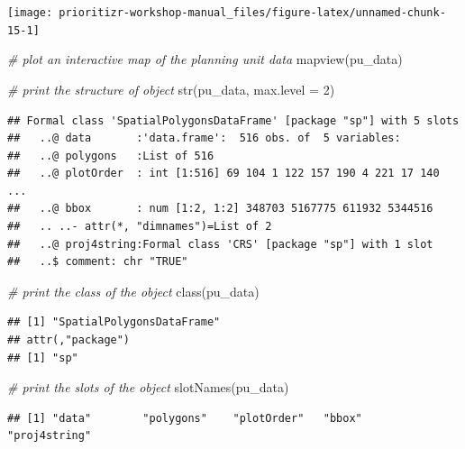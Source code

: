 \documentclass[
  12pt,
]{book}
\newenvironment{Shaded}{\begin{snugshade}}{\end{snugshade}}
\newcommand{\AttributeTok}[1]{\textcolor[rgb]{0.77,0.63,0.00}{#1}}
\newcommand{\CommentTok}[1]{\textcolor[rgb]{0.56,0.35,0.01}{\textit{#1}}}
\newcommand{\DecValTok}[1]{\textcolor[rgb]{0.00,0.00,0.81}{#1}}
\newcommand{\FunctionTok}[1]{\textcolor[rgb]{0.00,0.00,0.00}{#1}}
\newcommand{\NormalTok}[1]{#1}
\begin{document}
\begin{center}\texttt{[image: prioritizr-workshop-manual\_files/figure-latex/unnamed-chunk-15-1]} \end{center}

\begin{Shaded}
\begin{Highlighting}[]
\CommentTok{\# plot an interactive map of the planning unit data}
\FunctionTok{mapview}\NormalTok{(pu\_data)}
\end{Highlighting}
\end{Shaded}

\begin{Shaded}
\begin{Highlighting}[]
\CommentTok{\# print the structure of object}
\FunctionTok{str}\NormalTok{(pu\_data, }\AttributeTok{max.level =} \DecValTok{2}\NormalTok{)}
\end{Highlighting}
\end{Shaded}

\begin{verbatim}
## Formal class 'SpatialPolygonsDataFrame' [package "sp"] with 5 slots
##   ..@ data       :'data.frame':  516 obs. of  5 variables:
##   ..@ polygons   :List of 516
##   ..@ plotOrder  : int [1:516] 69 104 1 122 157 190 4 221 17 140 ...
##   ..@ bbox       : num [1:2, 1:2] 348703 5167775 611932 5344516
##   .. ..- attr(*, "dimnames")=List of 2
##   ..@ proj4string:Formal class 'CRS' [package "sp"] with 1 slot
##   ..$ comment: chr "TRUE"
\end{verbatim}

\begin{Shaded}
\begin{Highlighting}[]
\CommentTok{\# print the class of the object}
\FunctionTok{class}\NormalTok{(pu\_data)}
\end{Highlighting}
\end{Shaded}

\begin{verbatim}
## [1] "SpatialPolygonsDataFrame"
## attr(,"package")
## [1] "sp"
\end{verbatim}

\begin{Shaded}
\begin{Highlighting}[]
\CommentTok{\# print the slots of the object}
\FunctionTok{slotNames}\NormalTok{(pu\_data)}
\end{Highlighting}
\end{Shaded}

\begin{verbatim}
## [1] "data"        "polygons"    "plotOrder"   "bbox"        "proj4string"
\end{verbatim}
\end{document}
